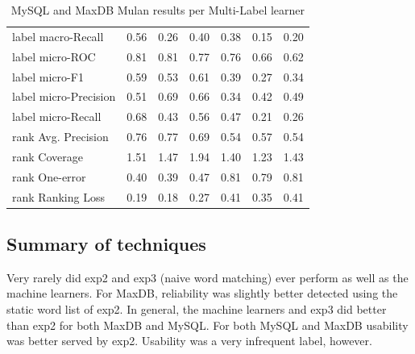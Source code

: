 \documentclass{acm_proc_article-sp}
\begin{document}
\begin{table}
\begin{tabular}{l|ccc|ccc}
label macro-Recall & 0.56 & 0.26 & 0.40 &         0.38  &  0.15  &  0.20 \\ 
                                                                            
label micro-ROC & 0.81 & 0.81 & 0.77 &            0.76  &  0.66  &  0.62 \\ 
                                                                            
label micro-F1 & 0.59 & 0.53 & 0.61 &             0.39  &  0.27  &  0.34 \\ 
                                                                            
label micro-Precision & 0.51 & 0.69 & 0.66 &      0.34  &  0.42  &  0.49 \\ 
                                                                            
label micro-Recall & 0.68 & 0.43 & 0.56 &         0.47  &  0.21  &  0.26 \\ 
      \hline                                                                      
rank Avg. Precision & 0.76 & 0.77 & 0.69 &          0.54  &  0.57  &  0.54 \\ 
                                                                            
rank Coverage & 1.51 & 1.47 & 1.94 &              1.40  &  1.23  &  1.43 \\ 
                                                                            
rank One-error & 0.40 & 0.39 & 0.47 &             0.81  &  0.79  &  0.81 \\ 
                                                                            
rank Ranking Loss & 0.19 & 0.18 & 0.27 &          0.41  &  0.35  &  0.41 \\ 
\hline
\end{tabular}
\caption{MySQL and MaxDB Mulan results per Multi-Label learner}
\label{tab:mulan}
\end{table}


\subsection{Summary of techniques}

Very rarely did \textsf{exp2} and \textsf{exp3} (naive word matching) ever perform as well as the machine learners. For MaxDB, reliability was slightly better detected using the static word list of \textsf{exp2}. In general, the machine learners and \textsf{exp3} did better than \textsf{exp2} for both MaxDB and MySQL. For both MySQL and MaxDB usability was better served by \textsf{exp2}. Usability was a very infrequent label, however.
\end{document}
